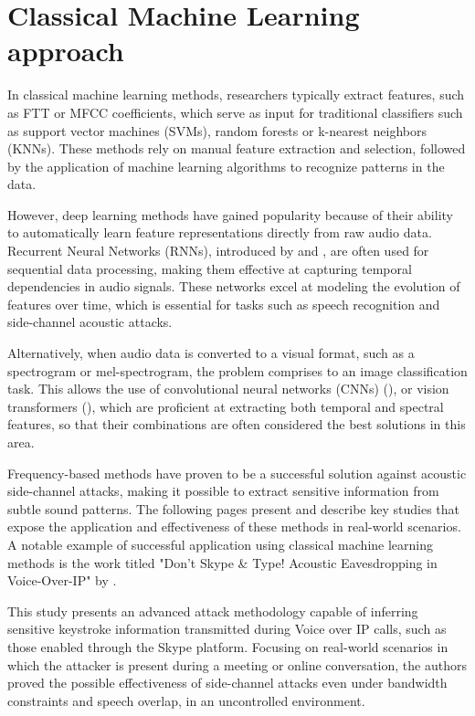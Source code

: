 \documentclass[a4paper,11pt,twoside]{report}
\theoremstyle{definition}
\begin{document}
\section*{Classical Machine Learning approach}

In classical machine learning methods, researchers typically extract features, such as FTT or MFCC coefficients, which serve as input for traditional classifiers such as support vector machines (SVMs), random forests or k-nearest neighbors (KNNs). These methods rely on manual feature extraction and selection, followed by the application of machine learning algorithms to recognize patterns in the data.

However, deep learning methods have gained popularity because of their ability to automatically learn feature representations directly from raw audio data. Recurrent Neural Networks (RNNs), introduced by \textit{\cite{rnn1}} and \textit{\cite{rnn2}}, are often used for sequential data processing, making them effective at capturing temporal dependencies in audio signals. These networks excel at modeling the evolution of features over time, which is essential for tasks such as speech recognition and side-channel acoustic attacks.

Alternatively, when audio data is converted to a visual format, such as a spectrogram or mel-spectrogram, the problem comprises to an image classification task. This allows the use of convolutional neural networks (CNNs) (\textit{\cite{cnn}}), or vision transformers (\textit{\cite{vit}}), which are proficient at extracting both temporal and spectral features, so that their combinations are often considered the best solutions in this area.

Frequency-based methods have proven to be a successful solution against acoustic side-channel attacks, making it possible to extract sensitive information from subtle sound patterns. The following pages present and describe key studies that expose the application and effectiveness of these methods in real-world scenarios.\\


A notable example of successful application using classical machine learning methods is the work titled "Don’t Skype \& Type! Acoustic Eavesdropping in Voice-Over-IP" by \textit{\cite{skypetype}}.

This study presents an advanced attack methodology capable of inferring sensitive keystroke information transmitted during Voice over IP calls, such as those enabled through the Skype platform. Focusing on real-world scenarios in which the attacker is present during a meeting or online conversation, the authors proved the possible effectiveness of side-channel attacks even under bandwidth constraints and speech overlap, in an uncontrolled environment.
\end{document}
